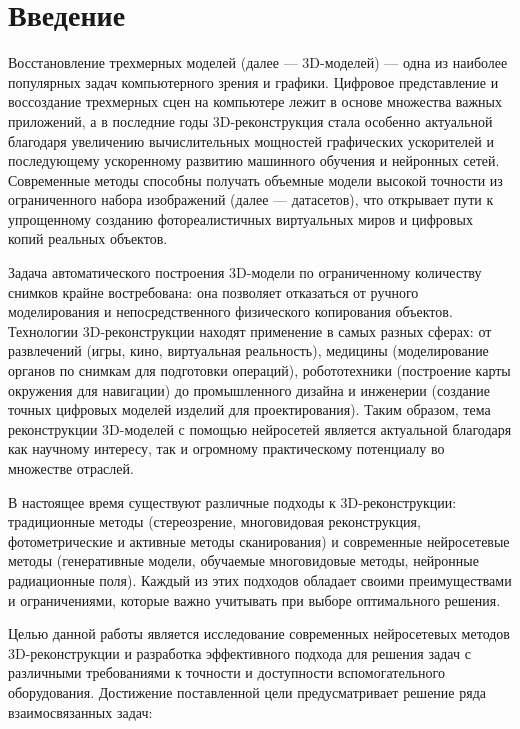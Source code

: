 \chapter{Введение}

Восстановление трехмерных моделей (далее — 3D-моделей) — одна из наиболее
популярных задач компьютерного зрения и графики. Цифровое представление и
воссоздание трехмерных сцен на компьютере лежит в основе множества важных
приложений, а в последние годы 3D-реконструкция стала особенно актуальной
благодаря увеличению вычислительных мощностей графических ускорителей и
последующему ускоренному развитию машинного обучения и нейронных сетей.
Современные методы способны получать объемные модели высокой точности из
ограниченного набора изображений (далее — датасетов), что открывает пути к
упрощенному созданию фотореалистичных виртуальных миров и цифровых копий
реальных объектов.

Задача автоматического построения 3D-модели по ограниченному количеству снимков
крайне востребована: она позволяет отказаться от ручного моделирования и
непосредственного физического копирования объектов. Технологии 3D-реконструкции
находят применение в самых разных сферах: от развлечений (игры, кино,
виртуальная реальность), медицины (моделирование органов по снимкам для
подготовки операций), робототехники (построение карты окружения для навигации)
до промышленного дизайна и инженерии (создание точных цифровых моделей изделий
для проектирования). Таким образом, тема реконструкции 3D-моделей с помощью
нейросетей является актуальной благодаря как научному интересу, так и огромному
практическому потенциалу во множестве отраслей.

В настоящее время существуют различные подходы к 3D-реконструкции: традиционные
методы (стереозрение, многовидовая реконструкция, фотометрические и активные
методы сканирования) и современные нейросетевые методы (генеративные модели,
обучаемые многовидовые методы, нейронные радиационные поля). Каждый из этих
подходов обладает своими преимуществами и ограничениями, которые важно учитывать
при выборе оптимального решения.

Целью данной работы является исследование современных нейросетевых методов
3D-реконструкции и разработка эффективного подхода для решения задач
с различными требованиями к точности и доступности вспомогательного
оборудования. Достижение поставленной цели предусматривает решение ряда
взаимосвязанных задач:

